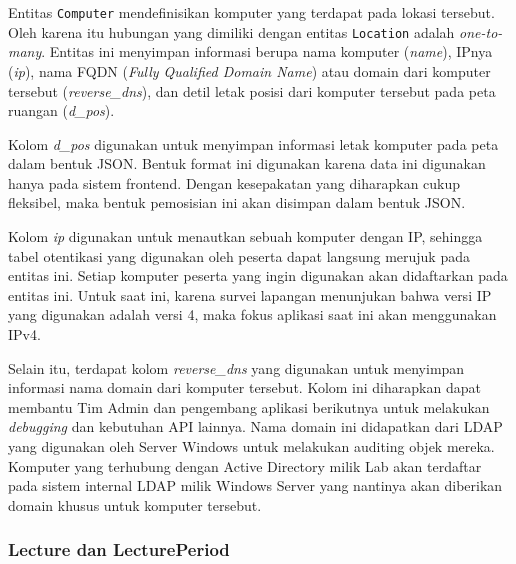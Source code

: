     Entitas \texttt{Computer} mendefinisikan komputer yang terdapat pada lokasi
    tersebut. Oleh karena itu hubungan yang dimiliki dengan entitas
    \texttt{Location} adalah \textit{one-to-many}. Entitas ini menyimpan
    informasi berupa nama komputer (\textit{name}), IPnya (\textit{ip}), nama
    FQDN (\textit{Fully Qualified Domain Name}) atau domain dari komputer
    tersebut (\textit{reverse\_dns}), dan detil letak posisi dari komputer
    tersebut pada peta ruangan (\textit{d\_pos}).
    
    Kolom \textit{d\_pos} digunakan untuk menyimpan informasi letak komputer
    pada peta dalam bentuk JSON. Bentuk format ini digunakan karena data ini
    digunakan hanya pada sistem frontend. Dengan kesepakatan yang diharapkan
    cukup fleksibel, maka bentuk pemosisian ini akan disimpan dalam bentuk JSON.
    
    Kolom \textit{ip} digunakan untuk menautkan sebuah komputer dengan IP,
    sehingga tabel otentikasi yang digunakan oleh peserta dapat langsung merujuk
    pada entitas ini. Setiap komputer peserta yang ingin digunakan akan
    didaftarkan pada entitas ini. Untuk saat ini, karena survei lapangan
    menunjukan bahwa versi IP yang digunakan adalah versi 4, maka fokus aplikasi
    saat ini akan menggunakan IPv4.
    
    Selain itu, terdapat kolom \textit{reverse\_dns} yang digunakan untuk
    menyimpan informasi nama domain dari komputer tersebut. Kolom ini diharapkan
    dapat membantu Tim Admin dan pengembang aplikasi berikutnya untuk melakukan
    \textit{debugging} dan kebutuhan API lainnya. Nama domain ini didapatkan
    dari LDAP yang digunakan oleh Server Windows untuk melakukan auditing objek
    mereka. Komputer yang terhubung dengan Active Directory milik Lab akan
    terdaftar pada sistem internal LDAP milik Windows Server yang nantinya akan
    diberikan domain khusus untuk komputer tersebut.

\subsubsection{Lecture dan LecturePeriod}

